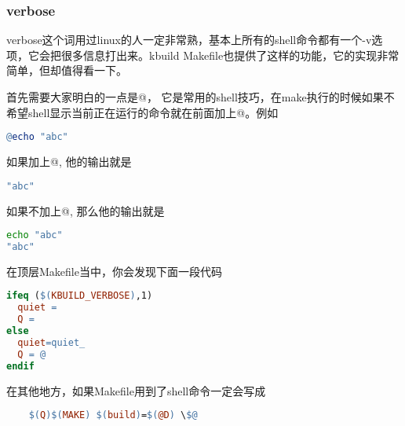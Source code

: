 \subsubsection{verbose}
verbose这个词用过linux的人一定非常熟，基本上所有的shell命令都有一个-v选项，它会把很多信息打出来。kbuild Makefile也提供了这样的功能，它的实现非常简单，但却值得看一下。

首先需要大家明白的一点是@， 它是常用的shell技巧，在make执行的时候如果不希望shell显示当前正在运行的命令就在前面加上@。例如
\begin{lstlisting}[language=make]
@echo "abc"
\end{lstlisting}
如果加上@, 他的输出就是
\begin{lstlisting}[language=bash]
"abc"
\end{lstlisting}
如果不加上@, 那么他的输出就是
\begin{lstlisting}[language=bash]
echo "abc"
"abc"
\end{lstlisting}

在顶层Makefile当中，你会发现下面一段代码
\begin{lstlisting}[language=make]
ifeq ($(KBUILD_VERBOSE),1)
  quiet =
  Q =
else
  quiet=quiet_
  Q = @
endif
\end{lstlisting}
在其他地方，如果Makefile用到了shell命令一定会写成

\begin{lstlisting}[language=make]
%.s: %.c scripts FORCE
    $(Q)$(MAKE) $(build)=$(@D) \$@
\end{lstlisting}
